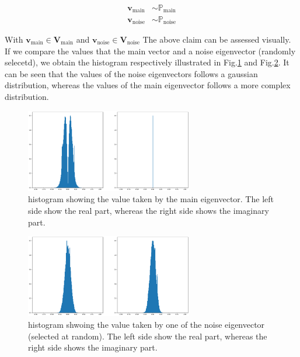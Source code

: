 \documentclass{article}
\begin{document}
\begin{align}
    \mathbf{v}_{\text{main}} &\sim \mathbb{P}_{\text{main}} \\
    \mathbf{v}_{\text{noise}} &\sim \mathbb{P}_{\text{noise}}  
\end{align}

With $\mathbf{v}_{\text{main}} \in  \mathbf{V}_{\text{main}}$ and $\mathbf{v}_\text{noise} \in  \mathbf{V}_{\text{noise}}$ The above claim can be assessed visually. If we compare the values that the main vector and a noise eigenvector (randomly selecetd), we obtain the histogram respectively illustrated in Fig.\ref{fig:histogram_main_eigenvector} and Fig.\ref{fig:histogram_noise_eigenvector}. It can be seen that the values of the noise eigenvectors follows a gaussian distribution, whereas the values of the main eigenvector follows a more complex distribution.
 
\begin{figure}
    \centering
    \includegraphics[width=0.65\textwidth]{../figs/histogram_main_eigenvector.png}
    \caption{histogram showing the value taken by the main eigenvector. The left side show the real part, whereas the right side shows the imaginary part.}
    \label{fig:histogram_main_eigenvector}
\end{figure}

\begin{figure}
    \centering
    \includegraphics[width=0.65\textwidth]{../figs/histogram_noise_eigenvector.png}
    \caption{histogram shwoing the value taken by one of the noise eigenvector (selected at random). The left side show the real part, whereas the right side shows the imaginary part.}
    \label{fig:histogram_noise_eigenvector}
\end{figure}
\end{document}
